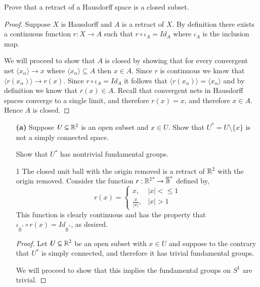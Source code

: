\documentclass{homework651}
\newcommand{\bbB}{\mathbb{B}}
\begin{document}
\begin{problems}
\problem Prove that a retract of a Hausdorff space is a closed subset. 
\begin{proof} Suppose $X$ is Hausdorff and $A$ is a retract of $X$. By definition there exists a continuous function $r: X \to A$ such that $r\circ \iota_A = Id_A$ where $\iota_A$ is the inclusion map. 

    We will proceed to show that $A$ is closed by showing that for every convergent net $\langle x_\alpha \rangle \to x$ where $\langle x_\alpha \rangle \subseteq A$ then $x \in A$. Since $r$ is continuous we know that $\langle r(x_{\alpha}) \rangle \to r(x)$. Since $r\circ \iota_A = Id_A$ it follows that $\langle r(x_{\alpha}) \rangle = \langle x_\alpha \rangle$ and by definition we know that $r(x) \in A$. Recall that convergent nets in Hausdorff spaces converge to a single limit, and therefore $r(x) = x$, and therefore $x \in A$. Hence $A$ is closed.     
\end{proof}


\problem \begin{enumerate}
    \item[\textbf{(a)}] Suppose $U \subseteq \mathbb R^2$ is an open subset and $x \in U$. Show that $U^* = U \setminus\{x\}$ is not a simply connected space.
    
    Show that $U^*$ has nontrivial fundamental groups. 

    \begin{lemma}1 The closed unit ball with the origin removed is a retract of $\mathbb R^2$ with the origin removed. Consider the function $r: {\RR^2}^* \to \overline{\bbB}^*$ defined by, 
        \begin{equation*}
            r(x) = \begin{cases}
                x, & |x| < \leq 1\\
                \frac{x}{|x|}, & |x|>1
            \end{cases}
        \end{equation*}
        This function is clearly continuous and has the property that $\iota_{\overline{\bbB}^*} \circ r(x) = Id_{\overline{\bbB}^*}$, as desired. 
    \end{lemma}

     
    \begin{proof} Let $U \subseteq \mathbb R^2$ be an open subset with $x \in U$ and suppose to the contrary that $U^*$ is simply connected, and therefore it has trivial fundamental groups. 

        We will proceed to show that this implies the fundamental groups on $S^1$ are trivial. 
        

\end{proof}
\end{enumerate}
\end{problems}
\end{document}
